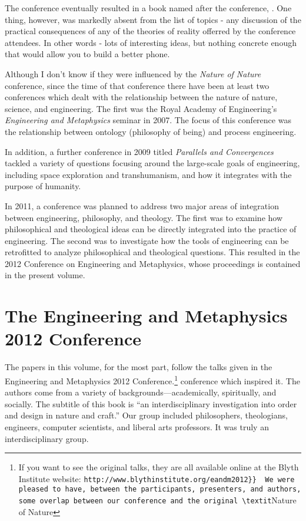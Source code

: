 The conference eventually resulted in a book named after the conference, .\citep{natnat2011}  One thing, however, was markedly absent from the list of topics - any discussion of the practical consequences of any of the theories of reality offerred by the conference attendees.  In other words - lots of interesting ideas, but nothing concrete enough that would allow you to build a better phone.

Although I don't know if they were influenced by the \textit{Nature of Nature} conference, since the time of that conference there have been at least two conferences which dealt with the relationship between the nature of nature, science, and engineering.
The first was the Royal Academy of Engineering's \textit{Engineering and Metaphysics} seminar in 2007.  The focus of this conference was the relationship between ontology (philosophy of being) and process engineering.  %

In addition, a further conference in 2009 titled \textit{Parallels and Convergences} tackled a variety of questions focusing around the large-scale goals of engineering, including space exploration and transhumanism, and how it integrates with the purpose of humanity. %

In 2011, a conference was planned to address two major areas of integration between engineering, philosophy, and theology.  The first was to examine how philosophical and theological ideas can be directly integrated into the practice of engineering.  The second was to investigate how the tools of engineering can be retrofitted to analyze philosophical and theological questions.  This resulted in the 2012 Conference on Engineering and Metaphysics, whose proceedings is contained in the present volume.

\section{The Engineering and Metaphysics 2012 Conference}

The papers in this volume, for the most part, follow the talks given in the Engineering and Metaphysics 2012 Conference.\footnote{If you want to see the original talks, they are all available online at the Blyth Institute website: \verb{http://www.blythinstitute.org/eandm2012}}  We were pleased to have, between the participants, presenters, and authors, some overlap between our conference and the original \textit{Nature of Nature} conference which inspired it.  The authors come from a variety of backgrounds---academically, spiritually, and socially.  The subtitle of this book is ``an interdisciplinary investigation into order and design in nature and craft.''  Our group included philosophers, theologians, engineers, computer scientists, and liberal arts professors.  It was truly an interdisciplinary group.  

